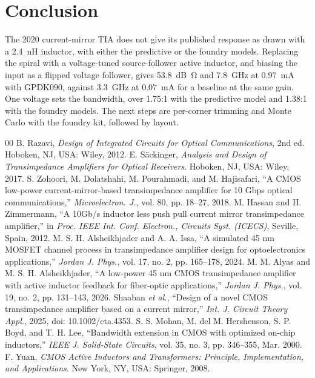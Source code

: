 \documentclass[conference]{IEEEtran}
\begin{document}
\section{Conclusion}
The 2020 current-mirror TIA does not give its published response as drawn with a \SI{2.4}{nH} inductor, with either the predictive or the foundry models. Replacing the spiral with a voltage-tuned source-follower active inductor, and biasing the input as a flipped voltage follower, gives \SI{53.8}{dB\ohm} and \SI{7.8}{GHz} at \SI{0.97}{mA} with GPDK090, against \SI{3.3}{GHz} at \SI{0.07}{mA} for a baseline at the same gain. One voltage sets the bandwidth, over 1.75:1 with the predictive model and 1.38:1 with the foundry models. The next steps are per-corner trimming and Monte Carlo with the foundry kit, followed by layout.

\begin{thebibliography}{00}
 B. Razavi, \emph{Design of Integrated Circuits for Optical Communications}, 2nd ed. Hoboken, NJ, USA: Wiley, 2012.
 E. S\"ackinger, \emph{Analysis and Design of Transimpedance Amplifiers for Optical Receivers}. Hoboken, NJ, USA: Wiley, 2017.
 S. Zohoori, M. Dolatshahi, M. Pourahmadi, and M. Hajisafari, ``A CMOS low-power current-mirror-based transimpedance amplifier for 10 Gbps optical communications,'' \emph{Microelectron. J.}, vol. 80, pp. 18--27, 2018.
 M. Hassan and H. Zimmermann, ``A 10Gb/s inductor less push pull current mirror transimpedance amplifier,'' in \emph{Proc. IEEE Int. Conf. Electron., Circuits Syst. (ICECS)}, Seville, Spain, 2012.
 M. S. H. Alsheikhjader and A. A. Issa, ``A simulated 45 nm MOSFET channel process in transimpedance amplifier design for optoelectronics applications,'' \emph{Jordan J. Phys.}, vol. 17, no. 2, pp. 165--178, 2024.
 M. M. Alyas and M. S. H. Alsheikhjader, ``A low-power 45 nm CMOS transimpedance amplifier with active inductor feedback for fiber-optic applications,'' \emph{Jordan J. Phys.}, vol. 19, no. 2, pp. 131--143, 2026.
 Shaaban \emph{et al.}, ``Design of a novel CMOS transimpedance amplifier based on a current mirror,'' \emph{Int. J. Circuit Theory Appl.}, 2025, doi: 10.1002/cta.4353.
 S. S. Mohan, M. del M. Hershenson, S. P. Boyd, and T. H. Lee, ``Bandwidth extension in CMOS with optimized on-chip inductors,'' \emph{IEEE J. Solid-State Circuits}, vol. 35, no. 3, pp. 346--355, Mar. 2000.
 F. Yuan, \emph{CMOS Active Inductors and Transformers: Principle, Implementation, and Applications}. New York, NY, USA: Springer, 2008.

\end{thebibliography}
\end{document}
